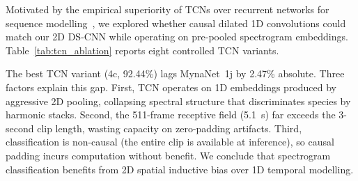 \documentclass[final,5p,times,twocolumn,nolinenum]{elsarticle}
\begin{document}
Motivated by the empirical superiority of TCNs over recurrent networks for
sequence modelling~\cite{bai2018empirical}, we explored whether causal
dilated 1D convolutions could match our 2D DS-CNN while operating on
pre-pooled spectrogram embeddings. Table~\ref{tab:tcn_ablation} reports
eight controlled TCN variants.

\begin{table}[ht]
\centering
\caption{TCN ablation study.
         Input: $64\times300$ embeddings, Mixup $\alpha=0.2$, 80:10:10 split,
         10-class dataset (historical). MynaNet row is 12-class Linux/CUDA authoritative.}
\label{tab:tcn_ablation}
\end{table}

The best TCN variant (4c, 92.44\%) lags MynaNet~1j by 2.47\% absolute.
Three factors explain this gap. First, TCN operates on 1D embeddings
produced by aggressive 2D pooling, collapsing spectral structure that
discriminates species by harmonic stacks. Second, the 511-frame receptive
field (5.1~s) far exceeds the 3-second clip length, wasting capacity on
zero-padding artifacts. Third, classification is non-causal (the entire
clip is available at inference), so causal padding incurs computation
without benefit. We conclude that spectrogram classification benefits from
2D spatial inductive bias over 1D temporal modelling.
\end{document}
